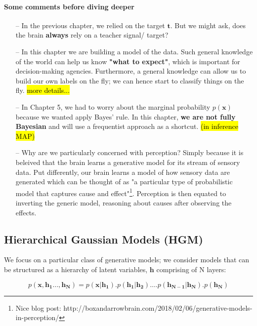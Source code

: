 \documentclass[main]{subfiles}
\begin{document}
\paragraph{Some comments before diving deeper}
\begin{itemize}
    \item [--] In the previous chapter, we relied on the target $\bm{t}$. But we might ask, does the brain \textbf{always} rely on a teacher signal/ target?
    \item [--] In this chapter we are building a model of the data. Such general knowledge of the world can help us know \textbf{"what to expect"}, which is important for decision-making agencies. Furthermore, a general knowledge can allow us to build our own labels on the fly; we can hence start to classify things on the fly. \hl{more details...}
    \item [--] In Chapter 5, we had to worry about the marginal probability $p(\bm{x})$ because we wanted apply Bayes' rule. In this chapter, \textbf{we are not fully Bayesian} and will use a frequentist approach as a shortcut. \hl{(in inference MAP)}
    \item [--] Why are we particularly concerned with perception? Simply because it is beleived that the brain learns a generative model for its stream of sensory data. Put differently, our brain learns a model of how sensory data are generated which can be  thought of as "a particular type of probabilistic model that captures cause and effect"\footnote{Nice blog post: http://boxandarrowbrain.com/2018/02/06/generative-models-in-perception/}. Perception is then equated to inverting the generic model, reasoning about causes after observing the effects.
\end{itemize}

\subsection{Hierarchical Gaussian Models (HGM)}
We focus on a particular class of generative models; we consider models that can be structured as a hierarchy of latent variables, $\bm{h}$ comprising of N layers:

\begin{equation}
    \boxed{
    p(\bm{x},\bm{h_1}\dots, \bm{h_N}) = p(\bm{x}|\bm{h_1}).p(\bm{h_1}|\bm{h_2})\dots .p(\bm{h_{N-1}}|\bm{h_N}). p(\bm{h_N})}
    \label{eq:joint_density}
\end{equation}
\end{document}
